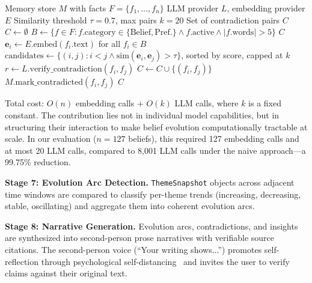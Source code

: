 \documentclass[conference]{IEEEtran}
\begin{document}
\begin{algorithm}[t]
\caption{Contradiction Detection}
\label{alg:contradiction}
\begin{algorithmic}[1]
\REQUIRE Memory store $M$ with facts $F = \{f_1, \ldots, f_n\}$
\REQUIRE LLM provider $L$, embedding provider $E$
\REQUIRE Similarity threshold $\tau = 0.7$, max pairs $k = 20$
\ENSURE Set of contradiction pairs $C$
\STATE $C \leftarrow \emptyset$
\STATE $B \leftarrow \{f \in F : f.\text{category} \in \{\text{Belief}, \text{Pref.}\} \wedge f.\text{active} \wedge |f.\text{words}| > 5\}$
    \RETURN $C$
\ENDIF
\STATE $\mathbf{e}_i \leftarrow E.\text{embed}(f_i.\text{text})$ for all $f_i \in B$ 
\STATE $\text{candidates} \leftarrow \{(i,j) : i < j \wedge \text{sim}(\mathbf{e}_i, \mathbf{e}_j) > \tau\}$, sorted by score, capped at $k$
    \STATE $r \leftarrow L.\text{verify\_contradiction}(f_i, f_j)$ 
        \STATE $C \leftarrow C \cup \{(f_i, f_j)\}$
        \STATE $M.\text{mark\_contradicted}(f_i, f_j)$
    \ENDIF
\ENDFOR
\RETURN $C$
\end{algorithmic}
\end{algorithm}

Total cost: $O(n)$ embedding calls $+$ $O(k)$ LLM calls, where $k$ is a fixed constant. The contribution lies not in individual model capabilities, but in structuring their interaction to make belief evolution computationally tractable at scale. In our evaluation ($n{=}127$ beliefs), this required 127 embedding calls and at most 20 LLM calls, compared to 8,001 LLM calls under the naive approach---a 99.75\% reduction.

\textbf{Stage 7: Evolution Arc Detection.} \texttt{ThemeSnapshot} objects across adjacent time windows are compared to classify per-theme trends (increasing, decreasing, stable, oscillating) and aggregate them into coherent evolution arcs.

\textbf{Stage 8: Narrative Generation.} Evolution arcs, contradictions, and insights are synthesized into second-person prose narratives with verifiable source citations. The second-person voice (``Your writing shows...'') promotes self-reflection through psychological self-distancing~\cite{kross2017selfdistancing} and invites the user to verify claims against their original text.

\end{document}
